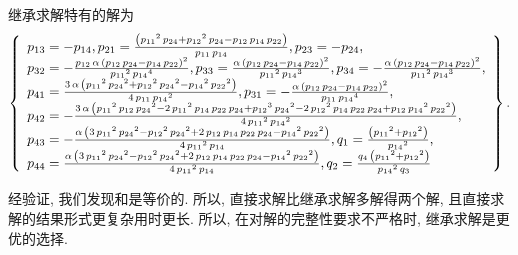 继承求解特有的解为 
\begin{equation}
\def\arraystretch{1.2}
\left\{
\begin{array}{l}
{{p}_{13}}=-{{p}_{14}},
{{p}_{21}}=\frac{\left( {{{p}_{11}}}^{2}\,{{p}_{24}}+{{{p}_{12}}}^{2}\,{{p}_{24}}-{{p}_{12}}\,{{p}_{14}}\,{{p}_{22}}\right) }{{{p}_{11}}\,{{p}_{14}}},
{{p}_{23}}=-{{p}_{24}},\\
{{p}_{32}}=-\frac{{{p}_{12}}\,\alpha\,\left( {{p}_{12}}\,{{p}_{24}}-{{p}_{14}}\,{{p}_{22}}\right) ^{2}}{{{{p}_{11}}}^{2}\,{{{p}_{14}}}^{4}},
{{p}_{33}}=\frac{\alpha\,\left( {{p}_{12}}\,{{p}_{24}}-{{p}_{14}}\,{{p}_{22}}\right) ^{2}}{{{{p}_{11}}}^{2}\,{{{p}_{14}}}^{3}},
{{p}_{34}}=-\frac{\alpha\,\left( {{p}_{12}}\,{{p}_{24}}-{{p}_{14}}\,{{p}_{22}}\right) ^{2}}{{{{p}_{11}}}^{2}\,{{{p}_{14}}}^{3}},\\
{{p}_{41}}=\frac{3\,\alpha\,\left( {{{p}_{11}}}^{2}\,{{{p}_{24}}}^{2}+{{{p}_{12}}}^{2}\,{{{p}_{24}}}^{2}-{{{p}_{14}}}^{2}\,{{{p}_{22}}}^{2}\right) }{4\,{{p}_{11}}\,{{{p}_{14}}}^{2}},
{{p}_{31}}=-\frac{\alpha\,\left( {{p}_{12}}\,{{p}_{24}}-{{p}_{14}}\,{{p}_{22}}\right) ^{2}}{{{p}_{11}}\,{{{p}_{14}}}^{4}},\\
{{p}_{42}}=-\frac{3\,\alpha\,\left( {{{p}_{11}}}^{2}\,{{p}_{12}}\,{{{p}_{24}}}^{2}-2\,{{{p}_{11}}}^{2}\,{{p}_{14}}\,{{p}_{22}}\,{{p}_{24}}+{{{p}_{12}}}^{3}\,{{{p}_{24}}}^{2}-2\,{{{p}_{12}}}^{2}\,{{p}_{14}}\,{{p}_{22}}\,{{p}_{24}}+{{p}_{12}}\,{{{p}_{14}}}^{2}\,{{{p}_{22}}}^{2}\right) }{4\,{{{p}_{11}}}^{2}\,{{{p}_{14}}}^{2}},\\ 
{{p}_{43}}=-\frac{\alpha\,\left( 3\,{{{p}_{11}}}^{2}\,{{{p}_{24}}}^{2}-{{{p}_{12}}}^{2}\,{{{p}_{24}}}^{2}+2\,{{p}_{12}}\,{{p}_{14}}\,{{p}_{22}}\,{{p}_{24}}-{{{p}_{14}}}^{2}\,{{{p}_{22}}}^{2}\right) }{4\,{{{p}_{11}}}^{2}\,{{p}_{14}}},
{{q}_{1}}=\frac{\left( {{{p}_{11}}}^{2}+{{{p}_{12}}}^{2}\right) }{{{{p}_{14}}}^{2}},\\ 
{{p}_{44}}=\frac{\alpha\,\left( 3\,{{{p}_{11}}}^{2}\,{{{p}_{24}}}^{2}-{{{p}_{12}}}^{2}\,{{{p}_{24}}}^{2}+2\,{{p}_{12}}\,{{p}_{14}}\,{{p}_{22}}\,{{p}_{24}}-{{{p}_{14}}}^{2}\,{{{p}_{22}}}^{2}\right) }{4\,{{{p}_{11}}}^{2}\,{{p}_{14}}},
{{q}_{2}}=\frac{{{q}_{4}}\,\left( {{{p}_{11}}}^{2}+{{{p}_{12}}}^{2}\right) }{{{{p}_{14}}}^{2}\,{{q}_{3}}}
\end{array}
\right\}. \label{2S1L-plot}
\end{equation}

经验证, 我们发现和是等价的. 所以, 直接求解比继承求解多解得两个解, 且直接求解的结果形式更复杂\D 用时更长. 所以, 在对解的完整性要求不严格时, 继承求解是更优的选择.

